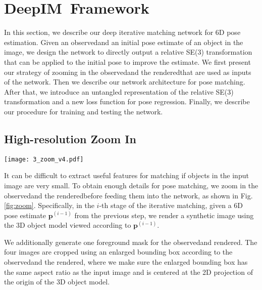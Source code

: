 \documentclass[twocolumn]{svjour3}
\newcommand{\dimnet}[0]{DeepIM}
\newcommand{\rend}[0]{rendered}
\newcommand{\real}[0]{observed}
\begin{document}
\section{\dimnet\ Framework}



In this section, we describe our deep iterative matching network for 6D pose estimation. Given an \real\image and an initial pose estimate of an object in the image, we design the network to directly output a relative SE(3) transformation that can be applied to the initial pose to improve the estimate. We first present our strategy of zooming in the \real\image and the \rend\image that are used as inputs of the network. Then we describe our network architecture for pose matching. After that, we introduce an untangled representation of the relative SE(3) transformation and a new loss function for pose regression. Finally, we describe our procedure for training and testing the network.




\subsection{High-resolution Zoom In}

\label{sec:zoom}

\begin{figure*}[t] 
	\centering
	\texttt{[image: 3\_zoom\_v4.pdf]}
	\caption{{\dimnet\ operates on a zoomed in, up-sampled input image, the rendered image, and the two object masks ($480\times640$ in our case after zooming in).}}
	\label{fig:zoom}
\end{figure*}

It can be difficult to extract useful features for matching if objects in the input image are very small. 
To obtain enough details for pose matching, we zoom in the \real\image and the \rend\image before feeding them into the network, as shown in Fig. \ref{fig:zoom}. 
Specifically, in the $i$-th stage of the iterative matching, given a 6D pose estimate $\mathbf{p}^{(i-1)}$ from the previous step, we render a synthetic image using the 3D object model viewed according to $\mathbf{p}^{(i-1)}$. 

We additionally generate one foreground mask for the \real\image and \rend\image. The four images are cropped using an enlarged bounding box according to the \real\mask and the \rend\mask, where we make sure the enlarged bounding box has the same aspect ratio as the input image and is centered at the 2D projection of the origin of the 3D object model. 
\end{document}
